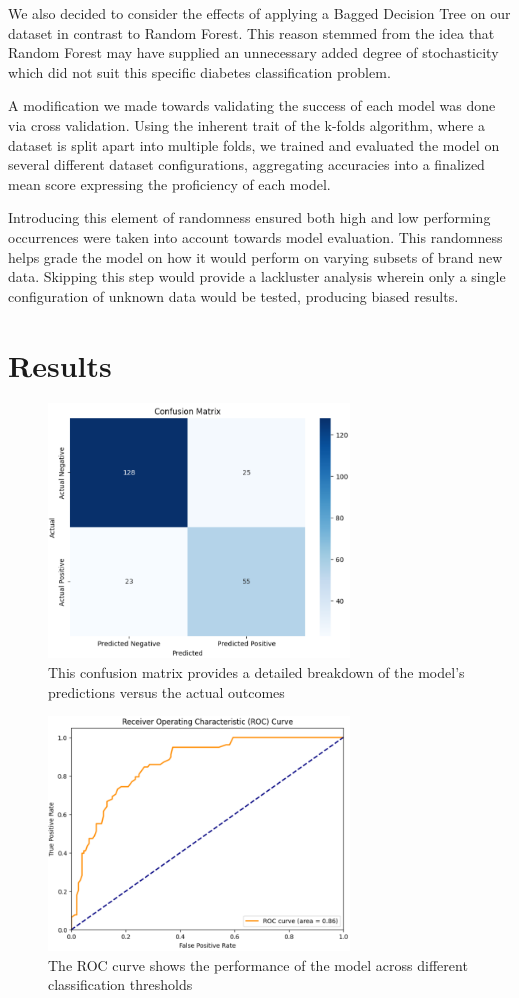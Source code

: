 \documentclass[journal]{IEEEtran}
\begin{document}
We also decided to consider the effects of applying a Bagged Decision Tree on our dataset in contrast to Random Forest. This reason stemmed from the idea that Random Forest may have supplied an unnecessary added degree of stochasticity which did not suit this specific diabetes classification problem. 

A modification we made towards validating the success of each model was done via cross validation. Using the inherent trait of the k-folds algorithm, where a dataset is split apart into multiple folds, we trained and evaluated the model on several different dataset configurations, aggregating accuracies into a finalized mean score expressing the proficiency of each model. 

Introducing this element of randomness ensured both high and low performing occurrences were taken into account towards model evaluation. This randomness helps grade the model on how it would perform on varying subsets of brand new data. Skipping this step would provide a lackluster analysis wherein only a single configuration of unknown data would be tested, producing biased results. 

\section{Results}

\begin{figure}
\centering
    \includegraphics[width=8cm]{CONF.png}
    \caption{This confusion matrix provides a detailed breakdown of the model's predictions versus the actual outcomes}
    \label{fig:enter-label}
\end{figure}

\begin{figure}
    \centering
    \includegraphics[width=8cm]{ROC.png}
    \caption{The ROC curve shows the performance of the model across different classification thresholds}
    \label{fig:enter-label}
\end{figure}
\end{document}
